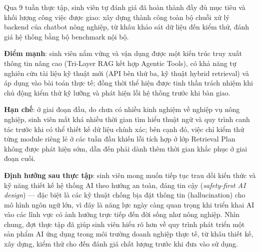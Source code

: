 Qua 9 tuần thực tập, sinh viên tự đánh giá đã hoàn thành đầy đủ mục tiêu và khối lượng
công việc được giao: xây dựng thành công toàn bộ chuỗi xử lý backend của chatbot nông
nghiệp, từ khâu khảo sát dữ liệu đến kiểm thử, đánh giá hệ thống bằng bộ benchmark nội
bộ.

\textbf{Điểm mạnh}: sinh viên nắm vững và vận dụng được một kiến trúc truy xuất thông
tin nâng cao (Tri-Layer RAG kết hợp Agentic Tools), có khả năng tự nghiên cứu tài liệu
kỹ thuật mới (API bên thứ ba, kỹ thuật hybrid retrieval) và áp dụng vào bài toán thực
tế; đồng thời thể hiện được tinh thần trách nhiệm khi chủ động kiểm thử kỹ lưỡng và phát
hiện lỗi hệ thống trước khi bàn giao.

\textbf{Hạn chế}: ở giai đoạn đầu, do chưa có nhiều kinh nghiệm về nghiệp vụ nông
nghiệp, sinh viên mất khá nhiều thời gian tìm hiểu thuật ngữ và quy trình canh tác trước
khi có thể thiết kế dữ liệu chính xác; bên cạnh đó, việc chỉ kiểm thử từng module riêng
lẻ ở các tuần đầu khiến lỗi tích hợp ở lớp Retrieval Plan không được phát hiện sớm, dẫn
đến phải dành thêm thời gian khắc phục ở giai đoạn cuối.

\textbf{Định hướng sau thực tập}: sinh viên mong muốn tiếp tục trau dồi kiến thức và kỹ
năng thiết kế hệ thống AI theo hướng an toàn, đáng tin cậy (\textit{safety-first AI
design}) — đặc biệt là các kỹ thuật chống bịa đặt thông tin (hallucination) cho mô hình
ngôn ngữ lớn, vì đây là năng lực ngày càng quan trọng khi triển khai AI vào các lĩnh vực
có ảnh hưởng trực tiếp đến đời sống như nông nghiệp. Nhìn chung, đợt thực tập đã giúp
sinh viên hiểu rõ hơn về quy trình phát triển một sản phẩm AI ứng dụng trong môi trường
doanh nghiệp thực tế, từ khâu thiết kế, xây dựng, kiểm thử cho đến đánh giá chất lượng
trước khi đưa vào sử dụng.